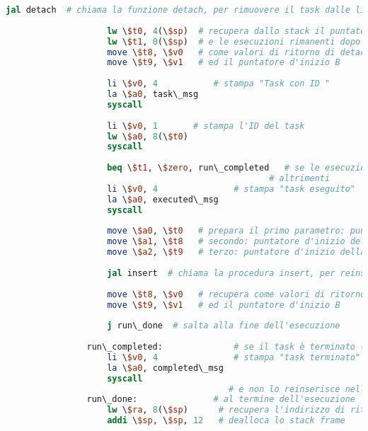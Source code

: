 \begin{center}
\begin{lstlisting}[language=mips, gobble=14, stepnumber=1]
                    jal detach  # chiama la funzione detach, per rimuovere il task dalle liste
                    
                    lw \$t0, 4(\$sp)  # recupera dallo stack il puntatore al task da eseguire
                    lw \$t1, 0(\$sp)  # e le esecuzioni rimanenti dopo l'esecuzione
                    move \$t8, \$v0   # come valori di ritorno di detach recupera il puntatore d'inizio A
                    move \$t9, \$v1   # ed il puntatore d'inizio B
                    
                    li \$v0, 4           # stampa "Task con ID "
                    la \$a0, task\_msg
                    syscall
                    
                    li \$v0, 1       # stampa l'ID del task
                    lw \$a0, 8(\$t0)
                    syscall
                    
                    beq \$t1, \$zero, run\_completed   # se le esecuzioni rimanenti sono zero, stampa "task terminato"
                                                    # altrimenti
                    li \$v0, 4               # stampa "task eseguito"      
                    la \$a0, executed\_msg
                    syscall
                    
                    move \$a0, \$t0   # prepara il primo parametro: puntatore al task eseguito
                    move \$a1, \$t8   # secondo: puntatore d'inizio della lista A
                    move \$a2, \$t9   # terzo: puntatore d'inizio della lista B
                    
                    jal insert  # chiama la procedura insert, per reinserire il task eseguito al posto giusto
                    
                    move \$t8, \$v0   # recupera come valori di ritorno il puntatore d'inizio A
                    move \$t9, \$v1   # ed il puntatore d'inizio B
                    
                    j run\_done  # salta alla fine dell'esecuzione
                    
                run\_completed:              # se il task è terminato (0 esecuzioni rimanenti)
                    li \$v0, 4               # stampa "task terminato"
                    la \$a0, completed\_msg
                    syscall
                                            # e non lo reinserisce nelle liste (eliminazione logica definitiva)
                run\_done:               # al termine dell'esecuzione
                    lw \$ra, 8(\$sp)      # recupera l'indirizzo di ritorno dallo stack
                    addi \$sp, \$sp, 12   # dealloca lo stack frame
                    

\end{lstlisting}
\end{center}
